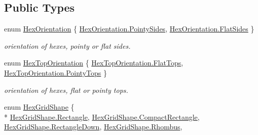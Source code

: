 \subsection*{Public Types}
\begin{DoxyCompactItemize}
\item 
enum \hyperlink{class_g_f_hex_grid_af3503ff5abb4dc3569875daa37dfd6e6_af3503ff5abb4dc3569875daa37dfd6e6}{Hex\+Orientation} \{ \hyperlink{class_g_f_hex_grid_af3503ff5abb4dc3569875daa37dfd6e6_af3503ff5abb4dc3569875daa37dfd6e6ae072b74647674927337f70f1f6af0666}{Hex\+Orientation.\+Pointy\+Sides}, 
\hyperlink{class_g_f_hex_grid_af3503ff5abb4dc3569875daa37dfd6e6_af3503ff5abb4dc3569875daa37dfd6e6a94a6b60f9e84da01af0db39053695834}{Hex\+Orientation.\+Flat\+Sides}
 \}
\begin{DoxyCompactList}\small\item\em orientation of hexes, pointy or flat sides.\end{DoxyCompactList}\item 
enum \hyperlink{class_g_f_hex_grid_aa82586fdc2de52a215609e48abcc265a_aa82586fdc2de52a215609e48abcc265a}{Hex\+Top\+Orientation} \{ \hyperlink{class_g_f_hex_grid_aa82586fdc2de52a215609e48abcc265a_aa82586fdc2de52a215609e48abcc265aa6474d6b6b7acbea9c60c3d0b941758ee}{Hex\+Top\+Orientation.\+Flat\+Tops}, 
\hyperlink{class_g_f_hex_grid_aa82586fdc2de52a215609e48abcc265a_aa82586fdc2de52a215609e48abcc265aaa2350be1698837b593a283f2eaf13c36}{Hex\+Top\+Orientation.\+Pointy\+Tops}
 \}
\begin{DoxyCompactList}\small\item\em orientation of hexes, flat or pointy tops.\end{DoxyCompactList}\item 
enum \hyperlink{class_g_f_hex_grid_a6394c0f75370f3b02e437f28e52127d7_a6394c0f75370f3b02e437f28e52127d7}{Hex\+Grid\+Shape} \{ \\*
\hyperlink{class_g_f_hex_grid_a6394c0f75370f3b02e437f28e52127d7_a6394c0f75370f3b02e437f28e52127d7ace9291906a4c3b042650b70d7f3b152e}{Hex\+Grid\+Shape.\+Rectangle}, 
\hyperlink{class_g_f_hex_grid_a6394c0f75370f3b02e437f28e52127d7_a6394c0f75370f3b02e437f28e52127d7aced30051e070abc63cbc6d897b26c5e2}{Hex\+Grid\+Shape.\+Compact\+Rectangle}, 
\hyperlink{class_g_f_hex_grid_a6394c0f75370f3b02e437f28e52127d7_a6394c0f75370f3b02e437f28e52127d7a37fe777298b67f1b38eb7a718952df65}{Hex\+Grid\+Shape.\+Rectangle\+Down}, 
\hyperlink{class_g_f_hex_grid_a6394c0f75370f3b02e437f28e52127d7_a6394c0f75370f3b02e437f28e52127d7ad62e74b4f4bdc571fb184229772ea930}{Hex\+Grid\+Shape.\+Rhombus}, 

\end{DoxyCompactItemize}
